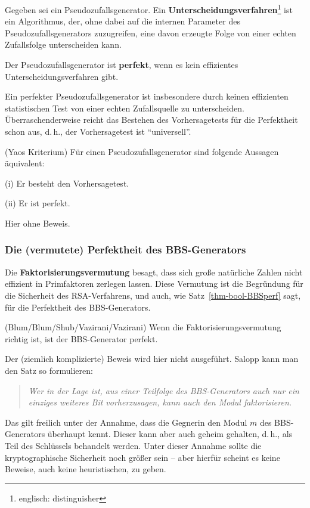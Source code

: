 \begin{refsegment}
\begin{definition}\label{def-bool-prg-perf}
  Gegeben sei ein Pseudozufallsgenerator.
  Ein {\bf  Unterscheidungsverfahren}\footnote{%
    englisch: distinguisher
  } ist ein Algorithmus, der, ohne dabei auf die internen Parameter des
  Pseudozufallsgenerators zuzugreifen, eine davon erzeugte Folge von
  einer echten Zufallsfolge unterscheiden kann.

  Der Pseudozufallsgenerator ist {\bf perfekt}, wenn
  es kein effizientes Unterscheidungsverfahren gibt.
\end{definition}
Ein perfekter Pseudozufallsgenerator ist insbesondere durch keinen
effizienten statistischen Test von einer echten Zufallsquelle zu
unterscheiden. Überraschenderweise reicht das Bestehen des
Vorhersagetests für die Perfektheit schon aus, d.\,h., der
Vorhersagetest ist "`universell"'.

\begin{satz} {\rm (Yaos Kriterium)}\label{thm-bool-YaoTh}
  Für einen Pseudozufallsgenerator sind folgende Aussagen äquivalent:

   {\rm (i)} Er besteht den Vorhersagetest.

   {\rm (ii)} Er ist perfekt.
\end{satz}
Hier ohne Beweis.


\subsubsection*{Die (vermutete) Perfektheit des BBS-Generators}

Die {\bf Faktorisierungsvermutung}
besagt, dass sich große natürliche
Zahlen nicht effizient in Primfaktoren zerlegen lassen. Diese
Vermutung ist die Begründung für die Sicherheit des RSA-Verfahrens,
und auch, wie Satz~\ref{thm-bool-BBSperf} sagt, für die Perfektheit
des BBS-Generators.

\begin{satz} {\rm (Blum/Blum/Shub/Vazirani/Vazirani)}\label{thm-bool-BBSperf}
   Wenn die Fak\-to\-ri\-sie\-rungs\-vermutung richtig ist, ist der BBS-Generator
   perfekt.
\end{satz}

Der (ziemlich komplizierte) Beweis wird hier nicht ausgeführt.
Salopp kann man den Satz so formulieren:
\begin{quote}
   {\em Wer in der Lage ist, aus einer Teilfolge des BBS-Generators
   auch nur ein einziges weiteres Bit vorherzusagen, kann auch
   den Modul faktorisieren.}
\end{quote}
Das gilt freilich unter der Annahme, dass die Gegnerin den Modul $m$ des BBS-Generators
überhaupt kennt. Dieser kann aber auch geheim gehalten, d.\,h., als Teil des
Schlüssels behandelt werden. Unter dieser Annahme sollte die kryptographische
Sicherheit noch größer sein -- aber hierfür scheint es keine Beweise, auch
keine heuristischen, zu geben.


\end{refsegment}
